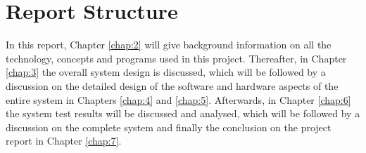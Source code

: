 \section{Report Structure}

In this report, Chapter \ref{chap:2} will give background information on all the
technology, concepts and programs used in this project. Thereafter, in Chapter
\ref{chap:3} the overall system design is discussed, which will be followed by a
discussion on the detailed design of the software and hardware aspects of the
entire system in Chapters \ref{chap:4} and \ref{chap:5}. Afterwards, in
Chapter \ref{chap:6} the system test results will be discussed and analysed,
which will be followed by a discussion on the complete system and finally the
conclusion on the project report in Chapter \ref{chap:7}.
